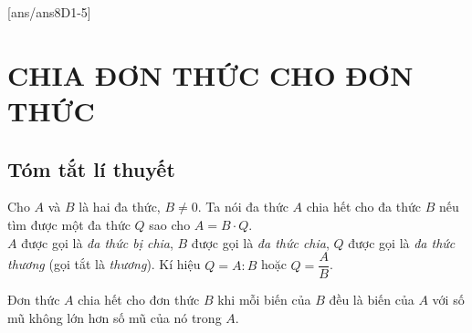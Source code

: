 [ans/ans8D1-5]
\section{CHIA ĐƠN THỨC CHO ĐƠN THỨC}
\subsection{Tóm tắt lí thuyết}
Cho $A$ và $B$ là hai đa thức, $B\ne 0$. Ta nói đa thức $A$ chia hết cho đa thức $B$ nếu tìm được một đa thức $Q$ sao cho $A=B\cdot Q$.\\
$A$ được gọi là \textit{đa thức bị chia}, $B$ được gọi là \textit{đa thức chia}, $Q$ được gọi là \textit{đa thức thương} (gọi tắt là \textit{thương}). Kí hiệu $Q=A:B$ hoặc $Q=\dfrac{A}{B}$.
\begin{note}
	Đơn thức $A$ chia hết cho đơn thức $B$ khi mỗi biến của $B$ đều là biến của $A$ với số mũ không lớn hơn số mũ của nó trong $A$.
\end{note}


